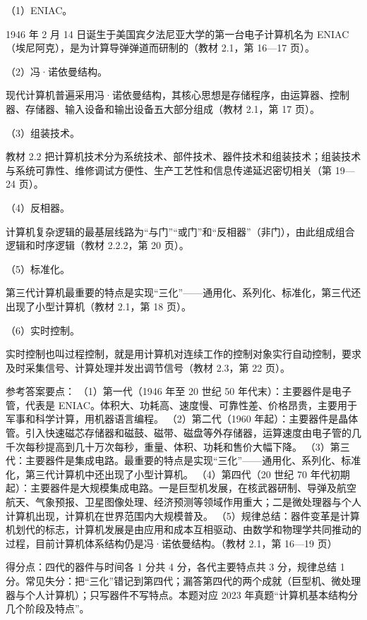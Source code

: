 \documentclass[a4paper,11pt]{article}
\begin{document}

\q （1）ENIAC。\begin{analysis}1946 年 2 月 14 日诞生于美国宾夕法尼亚大学的第一台电子计算机名为 ENIAC（埃尼阿克），是为计算导弹弹道而研制的（教材 2.1，第 16—17 页）。\end{analysis}

\q （2）冯·诺依曼结构。\begin{analysis}现代计算机普遍采用冯·诺依曼结构，其核心思想是存储程序，由运算器、控制器、存储器、输入设备和输出设备五大部分组成（教材 2.1，第 17 页）。\end{analysis}

\q （3）组装技术。\begin{analysis}教材 2.2 把计算机技术分为系统技术、部件技术、器件技术和组装技术；组装技术与系统可靠性、维修调试方便性、生产工艺性和信息传递延迟密切相关（第 19—24 页）。\end{analysis}

\q （4）反相器。\begin{analysis}计算机复杂逻辑的最基层线路为“与门”“或门”和“反相器”（非门），由此组成组合逻辑和时序逻辑（教材 2.2.2，第 20 页）。\end{analysis}

\q （5）标准化。\begin{analysis}第三代计算机最重要的特点是实现“三化”——通用化、系列化、标准化，第三代还出现了小型计算机（教材 2.1，第 18 页）。\end{analysis}

\q （6）实时控制。\begin{analysis}实时控制也叫过程控制，就是用计算机对连续工作的控制对象实行自动控制，要求及时采集信号、计算处理并发出调节信号（教材 2.3，第 22 页）。\end{analysis}


\q 参考答案要点：
（1）第一代（1946 年至 20 世纪 50 年代末）：主要器件是电子管，代表是 ENIAC。体积大、功耗高、速度慢、可靠性差、价格昂贵，主要用于军事和科学计算，用机器语言编程。
（2）第二代（1960 年起）：主要器件是晶体管。引入快速磁芯存储器和磁鼓、磁带、磁盘等外存储器，运算速度由电子管的几千次每秒提高到几十万次每秒，重量、体积、功耗和售价大幅下降。
（3）第三代：主要器件是集成电路。最重要的特点是实现“三化”——通用化、系列化、标准化，第三代计算机中还出现了小型计算机。
（4）第四代（20 世纪 70 年代初期起）：主要器件是大规模集成电路。一是巨型机发展，在核武器研制、导弹及航空航天、气象预报、卫星图像处理、经济预测等领域作用重大；二是微处理器与个人计算机出现，计算机在世界范围内大规模普及。
（5）规律总结：器件变革是计算机划代的标志，计算机发展是由应用和成本互相驱动、由数学和物理学共同推动的过程，目前计算机体系结构仍是冯·诺依曼结构。（教材 2.1，第 16—19 页）
\begin{analysis}得分点：四代的器件与时间各 1 分共 4 分，各代主要特点共 3 分，规律总结 1 分。常见失分：把“三化”错记到第四代；漏答第四代的两个成就（巨型机、微处理器与个人计算机）；只写器件不写特点。本题对应 2023 年真题“计算机基本结构分几个阶段及特点”。\end{analysis}
\end{document}

